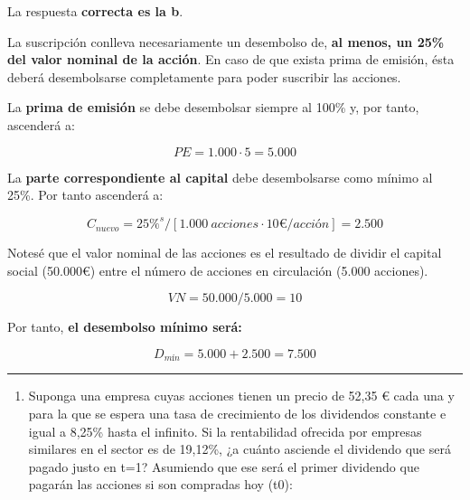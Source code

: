 \documentclass[
  letterpaper,
  DIV=11,
  numbers=noendperiod]{scrreprt}
\providecommand{\tightlist}{%
  \setlength{\itemsep}{0pt}\setlength{\parskip}{0pt}}\usepackage{longtable,booktabs,array}
\begin{document}
\begin{tcolorbox}[enhanced jigsaw, left=2mm, opacityback=0, colback=white, breakable, arc=.35mm, bottomrule=.15mm, rightrule=.15mm, toprule=.15mm, leftrule=.75mm, colframe=quarto-callout-tip-color-frame]
\begin{minipage}[t]{5.5mm}
\textcolor{quarto-callout-tip-color}{\faLightbulb}
\end{minipage}%
\begin{minipage}[t]{\textwidth - 5.5mm}

La respuesta \textbf{correcta es la b}.

La suscripción conlleva necesariamente un desembolso de, \textbf{al
menos, un 25\% del valor nominal de la acción}. En caso de que exista
prima de emisión, ésta deberá desembolsarse completamente para poder
suscribir las acciones.

La \textbf{prima de emisión} se debe desembolsar siempre al 100\% y, por
tanto, ascenderá a:

\[PE=1.000\cdot 5 = 5.000\]

La \textbf{parte correspondiente al capital} debe desembolsarse como
mínimo al 25\%. Por tanto ascenderá a:

\[C_{nuevo}=25\% ^s /[ 1.000 \ acciones \cdot 10€/acción] =2.500\]

Notesé que el valor nominal de las acciones es el resultado de dividir
el capital social (50.000€) entre el número de acciones en circulación
(5.000 acciones).

\[VN=50.000/5.000=10\]

Por tanto, \textbf{el desembolso mínimo será:}

\[D_{mín}=5.000 + 2.500 = 7.500\]

\end{minipage}%
\end{tcolorbox}

\begin{center}\rule{0.5\linewidth}{0.5pt}\end{center}

\begin{enumerate}
\def\labelenumi{\arabic{enumi}.}
\setcounter{enumi}{58}
\tightlist
\item
  Suponga una empresa cuyas acciones tienen un precio de 52,35 € cada
  una y para la que se espera una tasa de crecimiento de los dividendos
  constante e igual a 8,25\% hasta el infinito. Si la rentabilidad
  ofrecida por empresas similares en el sector es de 19,12\%, ¿a cuánto
  asciende el dividendo que será pagado justo en t=1? Asumiendo que ese
  será el primer dividendo que pagarán las acciones si son compradas hoy
  (t0):
\end{enumerate}
\end{document}
